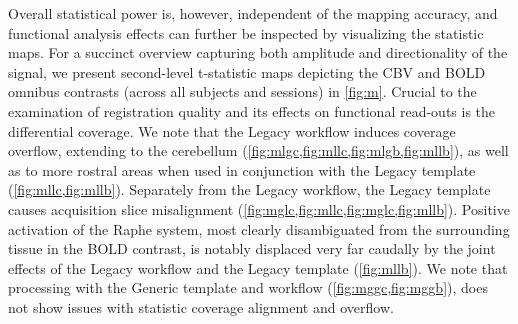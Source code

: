 Overall statistical power is, however, independent of the mapping accuracy, and functional analysis effects can further be inspected by visualizing the statistic maps.
For a succinct overview capturing both amplitude and directionality of the signal, we present second-level t-statistic maps depicting the CBV and BOLD omnibus contrasts (across all subjects and sessions) in \cref{fig:m}.
Crucial to the examination of registration quality and its effects on functional read-outs is the differential coverage.
We note that the Legacy workflow induces coverage overflow, extending to the cerebellum (\cref{fig:mlgc,fig:mllc,fig:mlgb,fig:mllb}), as well as to more rostral areas when used in conjunction with the Legacy template (\cref{fig:mllc,fig:mllb}).
Separately from the Legacy workflow, the Legacy template causes acquisition slice misalignment (\cref{fig:mglc,fig:mllc,fig:mglc,fig:mllb}).
Positive activation of the Raphe system, most clearly disambiguated from the surrounding tissue in the BOLD contrast, is notably displaced very far caudally by the joint effects of the Legacy workflow and the Legacy template (\cref{fig:mllb}).
We note that processing with the Generic template and workflow (\cref{fig:mggc,fig:mggb}), does not show issues with statistic coverage alignment and overflow.

